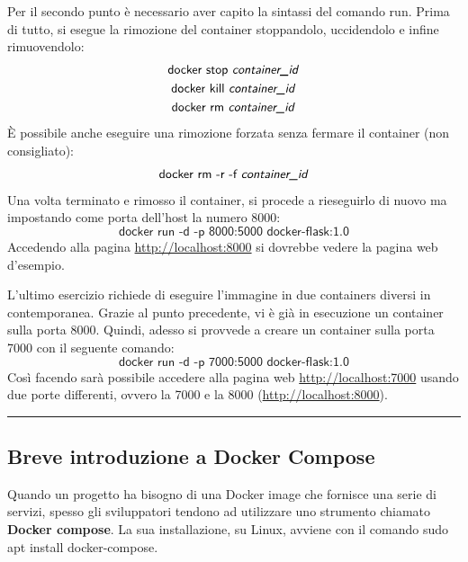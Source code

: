 \documentclass[a4paper]{article}
\newcommand{\longline}{\noindent\rule{\textwidth}{0.4pt}}
\begin{document}
	\noindent
	Per il secondo punto è necessario aver capito la sintassi del comando \textsf{run}. Prima di tutto, si esegue la rimozione del container stoppandolo, uccidendolo e infine rimuovendolo:
	\begin{gather*}
		\textsf{docker stop \emph{container\_id}} \\
		\textsf{docker kill \emph{container\_id}} \\
		\textsf{docker rm \emph{container\_id}}
	\end{gather*}
	È possibile anche eseguire una rimozione forzata senza fermare il container (non consigliato):
	\begin{equation*}
		\textsf{docker rm -r -f \emph{container\_id}}
	\end{equation*}
	Una volta terminato e rimosso il container, si procede a rieseguirlo di nuovo ma impostando come porta dell'host la numero 8000:
	\begin{equation*}
		\textsf{docker run -d -p 8000:5000 docker-flask:1.0}
	\end{equation*}
	Accedendo alla pagina \url{http://localhost:8000} si dovrebbe vedere la pagina web d'esempio.\newline
	
	\noindent
	L'ultimo esercizio richiede di eseguire l'immagine in due containers diversi in contemporanea. Grazie al punto precedente, vi è già in esecuzione un container sulla porta 8000. Quindi, adesso si provvede a creare un container sulla porta 7000 con il seguente comando:
	\begin{equation*}
		\textsf{docker run -d -p 7000:5000 docker-flask:1.0}
	\end{equation*}
	Così facendo sarà possibile accedere alla pagina web \url{http://localhost:7000} usando due porte differenti, ovvero la 7000 e la 8000 (\url{http://localhost:8000}).
	
	\longline
	
	\subsection{Breve introduzione a Docker Compose}
	
	Quando un progetto ha bisogno di una Docker image che fornisce una serie di servizi, spesso gli sviluppatori tendono ad utilizzare uno strumento chiamato \textcolor{Red3}{\textbf{Docker compose}}. La sua installazione, su Linux, avviene con il comando \textsf{sudo apt install docker-compose}.\newline
	
\end{document}
